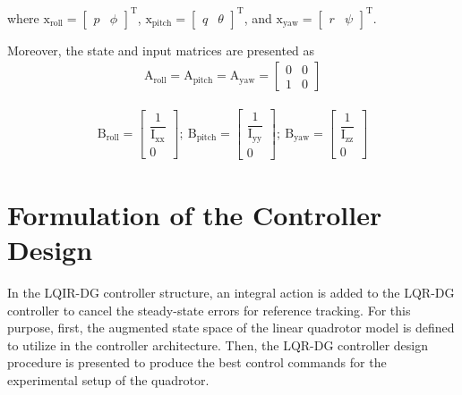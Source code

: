 \documentclass[conference]{IEEEtran}
\begin{document}
where $\boldsymbol{\mathrm{x}}_{\text{roll}} = \begin{bmatrix}
	p & \phi
\end{bmatrix}^\mathrm{T}$, $\boldsymbol{\mathrm{x}}_{\text{pitch}} = \begin{bmatrix}
	q & \theta \end{bmatrix}^\mathrm{T}$, and $\boldsymbol{\mathrm{x}}_{\text{yaw}} = \begin{bmatrix}
	r & \psi
\end{bmatrix}^\mathrm{T}$.


Moreover, the state and input matrices are presented as
\begin{equation}
	\begin{split}
		\boldsymbol{\mathrm{A}}_{\text{roll}}  =\boldsymbol{\mathrm{A}}_{\text{pitch}}  = \boldsymbol{\mathrm{A}}_{\text{yaw}}  = \begin{bmatrix}
			0 & 0\\
			1 & 0
		\end{bmatrix}
	\end{split}
\end{equation}

\begin{equation}
	\begin{split}
		\boldsymbol{\mathrm{B}}_{\text{roll}}  = \begin{bmatrix}
			\dfrac{1}{\mathrm{I}_{\text{xx}}}
			\\[1em]
			0
		\end{bmatrix};~ \boldsymbol{\mathrm{B}}_{\text{pitch}}  = \begin{bmatrix}
			\dfrac{1}{\mathrm{I}_{\text{yy}}}
			\\[1em]
			0
		\end{bmatrix};~ \boldsymbol{\mathrm{B}}_{\text{yaw}}  = \begin{bmatrix}
			\dfrac{1}{\mathrm{I}_{\text{zz}}}
			\\[1em]
			0
		\end{bmatrix}
	\end{split}
\end{equation}




\section{Formulation of the Controller Design}\label{sec: diff game}

\noindent In the LQIR-DG controller structure, an integral action is added to the LQR-DG controller to cancel the steady-state errors for reference tracking. For this purpose, first, the augmented state space of the linear quadrotor model is defined to utilize in the controller architecture. Then, the LQR-DG controller design procedure is presented to produce the best control commands for the experimental setup of the quadrotor.
\end{document}
